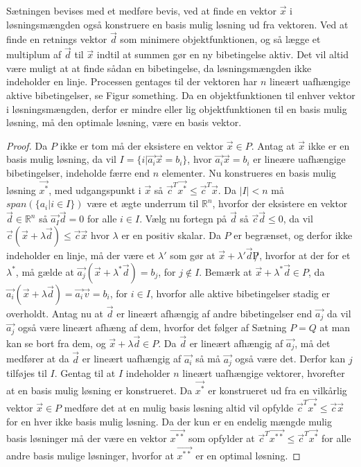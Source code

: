 Sætningen bevises med et medføre bevis, ved at finde en vektor $\vec{x}$ i løsningsmængden også konstruere en basis mulig løsning ud fra vektoren. 
Ved at finde en retnings vektor $\vec{d}$ som minimere objektfunktionen, og så lægge et multiplum af $\vec{d}$ til $\vec{x}$ indtil at summen gør en ny bibetingelse aktiv. 
Det vil altid være muligt at at finde sådan en bibetingelse, da løsningsmængden ikke indeholder en linje.
Processen gentages til der vektoren har $n$ lineært uafhængige aktive bibetingelser, se Figur something.
Da en objektfunktionen til enhver vektor i løsningsmængden, derfor er mindre eller lig objektfunktionen til en basis mulig løsning, må den optimale løsning, være en basis vektor.
\begin{proof}
Da $P$ ikke er tom må der eksistere en vektor $\vec{x} \in P$.
Antag at $\vec{x}$ ikke er en basis mulig løsning, da vil $I = \{i | \vec{a_i}\vec{x} = b_i\}$, hvor $\vec{a_i}\vec{x}=b_i$ er lineære uafhængige bibetingelser, indeholde færre end $n$ elementer. 
Nu konstrueres en basis mulig løsning $\vec{x^*}$, med udgangspunkt i $\vec{x}$ så $\vec{c}^T\vec{x^*}\leq \vec{c}^T\vec{x}$.
Da $|I|<n $ må $span(\{a_i | i \in I\})$ være et ægte underrum til $\mathds{R}^n$, hvorfor der eksistere en vektor $\vec{d} \in \mathds{R}^n$ så $\vec{a_I}\vec{d}=0$ for alle $i \in I$. 
Vælg nu fortegn på $\vec{d}$ så $\vec{c}\vec{d} \leq 0$, da vil $\vec{c}(\vec{x}+\lambda\vec{d}) \leq \vec{c}\vec{x}$ hvor $\lambda$ er en positiv skalar.
Da $P$ er begrænset, og derfor ikke indeholder en linje, må der være et $\lambda '$ som gør at $\vec{x}+\lambda '\vec{d} \not P$, hvorfor at der for et $\lambda^*$, må gælde at $\vec{a_j}(\vec{x}+\lambda^* \vec{d}) = b_j$, for $j \notin I$.
Bemærk at $\vec{x}+\lambda^*\vec{d} \in P$, da $\vec{a_i}(\vec{x}+\lambda\vec{d})= \vec{a_i}\vec{v} = b_i$, for $i \in I$, hvorfor alle aktive bibetingelser stadig er overholdt.
Antag nu at $\vec{d}$ er lineært afhængig af andre bibetingelser end $\vec{a_j}$ da vil $\vec{a_j}$ også være lineært afhæng af dem, hvorfor det følger af Sætning $P=Q$ at man kan se bort fra dem, og $\vec{x}+\lambda \vec{d} \in P$. 
Da $\vec{d}$ er lineært afhængig af $\vec{a_j}$, må det medfører at da $\vec{d}$ er lineært uafhængig af $\vec{a_i}$ så må $\vec{a_j}$ også være det. 
Derfor kan $j$ tilføjes til $I$. 
Gentag til at $I$ indeholder $n$ lineært uafhængige vektorer, hvorefter at en basis mulig løsning er konstrueret.
Da $\vec{x^*}$ er konstrueret ud fra en vilkårlig vektor $\vec{x}\in P$ medføre det at en mulig basis løsning altid vil opfylde $\vec{c}^T\vec{x^*} \leq \vec{c}\vec{x}$ for en hver ikke basis mulig løsning. 
Da der kun er en endelig mængde mulig basis løsninger må der være en vektor $\vec{x^{**}}$ som opfylder at $\vec{c}^T\vec{x^{**}}\leq \vec{c}^T\vec{x^*}$ for alle andre basis mulige løsninger, hvorfor at $\vec{x^{**}}$ er en optimal løsning.
\end{proof}
